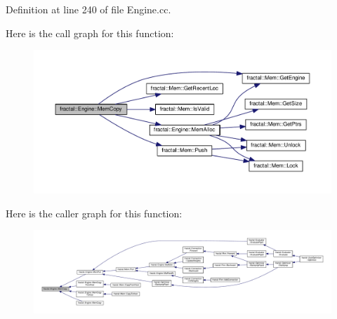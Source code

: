 Definition at line 240 of file Engine.\+cc.



Here is the call graph for this function\+:\nopagebreak
\begin{figure}[H]
\begin{center}
\leavevmode
\includegraphics[width=350pt]{d0/d81/classfractal_1_1Engine_a0459bc0fb6fcf39f8dccbd0f0ceb0446_cgraph}
\end{center}
\end{figure}




Here is the caller graph for this function\+:\nopagebreak
\begin{figure}[H]
\begin{center}
\leavevmode
\includegraphics[width=350pt]{d0/d81/classfractal_1_1Engine_a0459bc0fb6fcf39f8dccbd0f0ceb0446_icgraph}
\end{center}
\end{figure}


